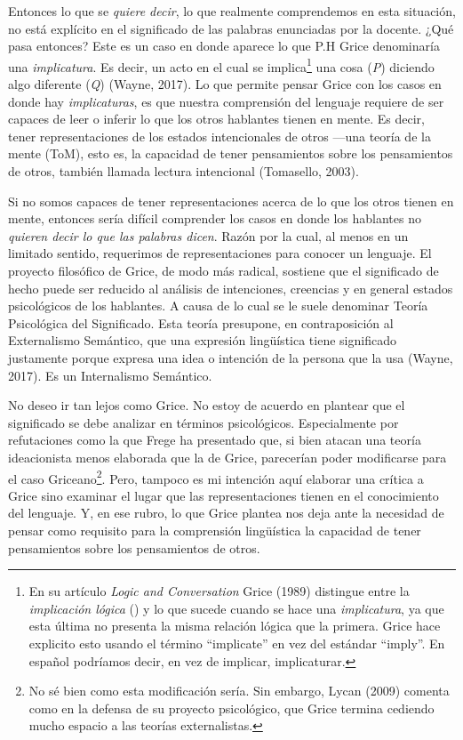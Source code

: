 \documentclass[]{book}
\begin{document}
\begin{refsection}
Entonces lo que se \emph{quiere decir}, lo que realmente comprendemos en
esta situación, no está explícito en el significado de las palabras
enunciadas por la docente. ¿Qué pasa entonces? Este es un caso en donde
aparece lo que P.H Grice denominaría una \emph{implicatura}. Es decir,
un acto en el cual se implica\footnote{En su artículo \emph{Logic and
  Conversation} Grice (1989) distingue entre la \emph{implicación
  lógica} () y lo que sucede cuando se hace una \emph{implicatura}, ya
  que esta última no presenta la misma relación lógica que la primera.
  Grice hace explicito esto usando el término ``implicate'' en vez del
  estándar ``imply''. En español podríamos decir, en vez de implicar,
  implicaturar.} una cosa (\emph{P}) diciendo algo diferente (\emph{Q})
(Wayne, 2017). Lo que permite pensar Grice con los casos en donde hay
\emph{implicaturas}, es que nuestra comprensión del lenguaje requiere de
ser capaces de leer o inferir lo que los otros hablantes tienen en
mente. Es decir, tener representaciones de los estados intencionales de
otros ---una teoría de la mente (ToM), esto es, la capacidad de tener
pensamientos sobre los pensamientos de otros, también llamada lectura
intencional (Tomasello, 2003).

Si no somos capaces de tener representaciones acerca de lo que los otros
tienen en mente, entonces sería difícil comprender los casos en donde
los hablantes no \emph{quieren decir lo que las palabras dicen}. Razón
por la cual, al menos en un limitado sentido, requerimos de
representaciones para conocer un lenguaje. El proyecto filosófico de
Grice, de modo más radical, sostiene que el significado de hecho puede
ser reducido al análisis de intenciones, creencias y en general estados
psicológicos de los hablantes. A causa de lo cual se le suele denominar
Teoría Psicológica del Significado. Esta teoría presupone, en
contraposición al Externalismo Semántico, que una expresión lingüística
tiene significado justamente porque expresa una idea o intención de la
persona que la usa (Wayne, 2017). Es un Internalismo Semántico.

No deseo ir tan lejos como Grice. No estoy de acuerdo en plantear que el
significado se debe analizar en términos psicológicos. Especialmente por
refutaciones como la que Frege ha presentado que, si bien atacan una
teoría ideacionista menos elaborada que la de Grice, parecerían poder
modificarse para el caso Griceano\footnote{No sé bien como esta
  modificación sería. Sin embargo, Lycan (2009) comenta como en la
  defensa de su proyecto psicológico, que Grice termina cediendo mucho
  espacio a las teorías externalistas.}. Pero, tampoco es mi intención
aquí elaborar una crítica a Grice sino examinar el lugar que las
representaciones tienen en el conocimiento del lenguaje. Y, en ese
rubro, lo que Grice plantea nos deja ante la necesidad de pensar como
requisito para la comprensión lingüística la capacidad de tener
pensamientos sobre los pensamientos de otros.


\end{refsection}
\end{document}
